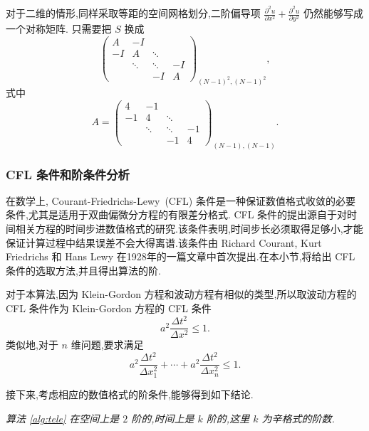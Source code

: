 对于二维的情形,同样采取等距的空间网格划分,二阶偏导项 $\frac{\partial ^2 u}{\partial x^2} + \frac{\partial ^2
u}{\partial y^2}$ 仍然能够写成一个对称矩阵. 只需要把 $S$ 换成
\begin{equation*}
\begin{pmatrix}
A&-I&&\\
-I&A&\ddots&\\
&\ddots&\ddots&-I\\
&&-I&A
\end{pmatrix}_{(N-1)^2,(N-1)^2},
\end{equation*}
式中
\begin{equation*}
A=\begin{pmatrix}
4&-1&&\\
-1&4&\ddots&\\
&\ddots&\ddots&-1\\
&&-1&4
\end{pmatrix}_{(N-1),(N-1)}.
\end{equation*}

\subsubsection{CFL 条件和阶条件分析}
在数学上, Courant-Friedrichs-Lewy~(CFL) 条件是一种保证数值格式收敛的必要条件,尤其是适用于双曲偏微分方程的有限差分格式. CFL 条件的提出源自于对时间相关方程的时间步进数值格式的研究.该条件表明,时间步长必须取得足够小,才能保证计算过程中结果误差不会大得离谱.该条件由 Richard Courant, Kurt Friedrichs 和 Hans Lewy 在1928年的一篇文章中首次提出\cite{courant1967onthe}.在本小节,将给出 CFL 条件的选取方法,并且得出算法的阶.

对于本算法,因为 Klein-Gordon 方程和波动方程有相似的类型,所以取波动方程的 CFL 条件作为 Klein-Gordon 方程的 CFL 条件
\begin{equation*}
a^2\frac{\Delta t^2}{\Delta x^2}\le 1.
\end{equation*}
类似地,对于 $n$ 维问题,要求满足
\begin{equation*}
a^2 \frac{\Delta t^2}{\Delta x_1^2}+\cdots+a^2 \frac{\Delta t^2}{\Delta x_n^2}\le 1.
\end{equation*}

接下来,考虑相应的数值格式的阶条件,能够得到如下结论.

\begin{theorem}\label{thm:tele}
\emph{算法 \ref{alg:tele} 在空间上是 $2$ 阶的,时间上是 $k$ 阶的,这里 $k$ 为辛格式的阶数.}
\end{theorem}

